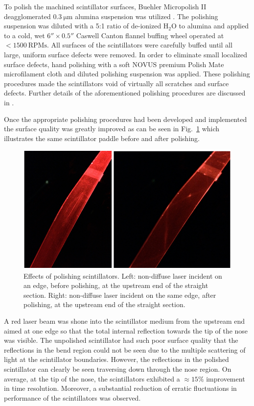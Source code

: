To polish the machined scintillator surfaces, Buehler Micropolish II deagglomerated $\mathrm{0.3\ \mu m}$ alumina suspension was utilized \cite{buehler}.  The polishing suspension was diluted with a 5:1 ratio of de-ionized $\mathrm{H_{2}O}$ to alumina and applied to a cold, wet $6'' \times 0.5''$ Caswell Canton flannel buffing wheel \cite{caswell} operated at $\mathrm{<1500~RPMs}$. All surfaces of the scintillators were carefully buffed until all large, uniform surface defects were removed. In order to eliminate small localized surface defects, hand polishing with a soft NOVUS premium Polish Mate microfilament cloth \cite{novus} and diluted polishing suspension was applied.  These polishing procedures made the scintillators void of virtually all scratches and surface defects.  Further details of the aforementioned polishing procedures are discussed in \cite{pooser16}.

Once the appropriate polishing procedures had been developed and implemented the surface quality was greatly improved as can be seen in Fig.~\ref{fig:polshing_effects} which illustrates the same scintillator paddle before and after polishing.
	\begin{figure}[!htb]
		\centering
		\includegraphics[width=1.0\columnwidth]{fabrication/figs/polshing_effects}
		\caption{Effects of polishing scintillators. Left: non-diffuse laser incident on an edge, before polishing, at the upstream end of the straight section. Right: non-diffuse laser incident on the same edge, after polishing, at the upstream end of the straight section.}
		\label{fig:polshing_effects}
	\end{figure}
A red laser beam was shone into the scintillator medium from the upstream end aimed at one edge so that the total internal reflection towards the tip of the nose was visible.  The unpolished scintillator had such poor surface quality that the reflections in the bend region could not be seen due to the multiple scattering of light at the scintillator boundaries.  However, the reflections in the polished scintillator can clearly be seen traversing down through the nose region.  On average, at the tip of the nose, the scintillators exhibited a $\approx15\%$ improvement in time resolution.  Moreover, a substantial reduction of erratic fluctuations in performance of the scintillators was observed.

